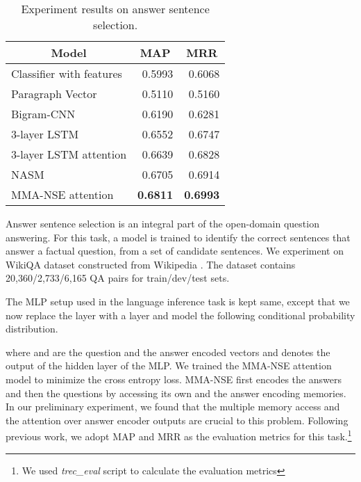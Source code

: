 \documentclass{article}
\begin{document}
\begin{table}[b]
\begin{center}
\small
\begin{tabular}{c|c|c}
\hline 
Model & MAP & MRR \\
\hline
\multicolumn{1}{l|}{Classifier with features \cite{yih13}} & \multicolumn{1}{|r|}{0.5993} & \multicolumn{1}{|r}{0.6068} \\
\hline
\multicolumn{1}{l|}{Paragraph Vector \cite{le2014}} & \multicolumn{1}{|r|}{0.5110} & \multicolumn{1}{|r}{0.5160} \\
\multicolumn{1}{l|}{Bigram-CNN \cite{yu2014}} & \multicolumn{1}{|r|}{0.6190} & \multicolumn{1}{|r}{0.6281} \\
\multicolumn{1}{l|}{3-layer LSTM \cite{miao2016}} & \multicolumn{1}{|r|}{0.6552} & \multicolumn{1}{|r}{0.6747} \\
\multicolumn{1}{l|}{3-layer LSTM attention \cite{miao2016}} & \multicolumn{1}{|r|}{0.6639} & \multicolumn{1}{|r}{0.6828} \\
\multicolumn{1}{l|}{NASM \cite{miao2016}} & \multicolumn{1}{|r|}{0.6705} & \multicolumn{1}{|r}{0.6914} \\
\multicolumn{1}{l|}{MMA-NSE attention} & \multicolumn{1}{|r|}{\bf 0.6811} & \multicolumn{1}{|r}{\bf 0.6993} \\
\hline
\end{tabular}
\end{center}
\caption{\label{table:qa}Experiment results on answer sentence selection.}
\end{table}

Answer sentence selection is an integral part of the open-domain question answering. For this task, a model is trained to identify the correct sentences that answer a factual question, from a set of candidate sentences. We experiment on WikiQA dataset constructed from Wikipedia \cite{yang2015wikiqa}. The dataset contains 20,360/2,733/6,165 QA pairs for train/dev/test sets. 

The MLP setup used in the language inference task is kept same, except that we now replace the  layer with a  layer and model the following conditional probability distribution.

where  and  are the question and the answer encoded vectors and  denotes the output of the hidden layer of the MLP. We trained the MMA-NSE attention model to minimize the  cross entropy loss. MMA-NSE first encodes the answers and then the questions by accessing its own and the answer encoding memories. In our preliminary experiment, we found that the multiple memory access and the attention over answer encoder outputs   are crucial to this problem. Following previous work, we adopt MAP and MRR as the evaluation metrics for this task.\footnote{We used \textit{trec\_eval} script to calculate the evaluation metrics}
\end{document}
